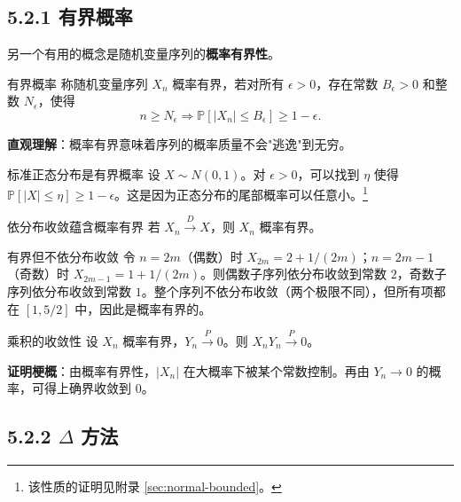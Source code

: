 \subsection{5.2.1 有界概率}

另一个有用的概念是随机变量序列的\textbf{概率有界性}。

\begin{definition}{有界概率}\label{def:bounded-in-probability}
称随机变量序列 ${X_n}$ 概率有界，若对所有 $\epsilon > 0$，存在常数 $B_\epsilon > 0$ 和整数 $N_\epsilon$，使得
\[
n \geq N_\epsilon \Rightarrow \mathbb{P}[|X_n| \leq B_\epsilon] \geq 1 - \epsilon.
\label{eq:bounded-in-probability}
\]
\end{definition}

\textbf{直观理解}：概率有界意味着序列的概率质量不会"逃逸"到无穷。

\begin{example}{标准正态分布是有界概率}\label{ex:normal-bounded}
设 $X \sim N(0,1)$。对 $\epsilon > 0$，可以找到 $\eta$ 使得 $\mathbb{P}[|X| \leq \eta] \geq 1 - \epsilon$。这是因为正态分布的尾部概率可以任意小。\footnote{该性质的证明见附录 \cref{sec:normal-bounded}。}
\end{example}

\begin{theorem}{依分布收敛蕴含概率有界}\label{th:dist-to-bounded}
若 $X_n \xrightarrow{D} X$，则 ${X_n}$ 概率有界。
\end{theorem}

\begin{example}{有界但不依分布收敛}\label{ex:bounded-not-converge}
令 $n = 2m$（偶数）时 $X_{2m} = 2 + 1/(2m)$；$n = 2m-1$（奇数）时 $X_{2m-1} = 1 + 1/(2m)$。则偶数子序列依分布收敛到常数 $2$，奇数子序列依分布收敛到常数 $1$。整个序列不依分布收敛（两个极限不同），但所有项都在 $[1, 5/2]$ 中，因此是概率有界的。
\end{example}

\begin{theorem}{乘积的收敛性}\label{th:product-convergence}
设 ${X_n}$ 概率有界，$Y_n \xrightarrow{P} 0$。则 $X_n Y_n \xrightarrow{P} 0$。
\end{theorem}

\textbf{证明梗概}：由概率有界性，$|X_n|$ 在大概率下被某个常数控制。再由 $Y_n \to 0$ 的概率，可得上确界收敛到 $0$。%

\subsection{5.2.2 $\Delta$ 方法}

